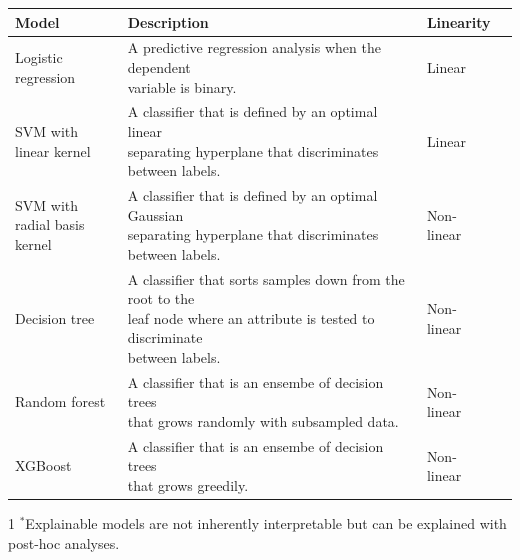 \documentclass[11pt,]{article}
\begin{document}
\begin{tabular}{|l|l|l|l|}
\hline

\rowcolor{lightgray}
\textbf{Model} & \textbf{Description} & \textbf{Linearity} \\ \hline

\makecell[l]{Logistic \\regression} & \makecell[l]{A predictive regression analysis when the dependent \\variable is binary.} & Linear \\ \hline

\makecell[l]{SVM with \\linear kernel} & \makecell[l]{A classifier that is defined by an optimal linear \\separating hyperplane that discriminates between labels.} & Linear  \\ \hline

\makecell[l]{SVM with \\radial basis kernel} & \makecell[l]{A classifier that is defined by an optimal Gaussian \\separating hyperplane that discriminates between labels.} & Non-linear \\ \hline
Decision tree & \makecell[l]{A classifier that sorts samples down from the
root to the \\leaf node where an attribute is tested to discriminate \\between labels.} & Non-linear \\ \hline

Random forest & \makecell[l]{A classifier that is an ensembe of decision trees \\ that grows randomly with subsampled data.} & Non-linear \\ \hline

XGBoost & \makecell[l]{A classifier that is an ensembe of decision trees \\ that grows greedily.} & Non-linear \\ \hline

\end{tabular}\begin{tablenotes}\footnotesize
\item[1]{$^*$Explainable models are not inherently interpretable but can be explained with post-hoc analyses.}
\end{tablenotes}\newpage

\small
\end{document}
